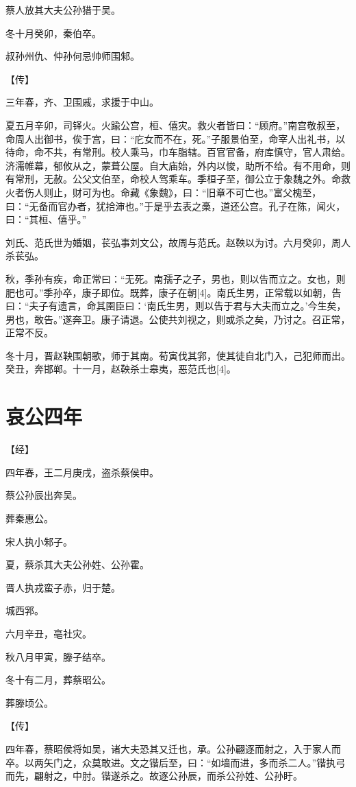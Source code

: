 \documentclass[a4paper,12pt,UTF8,twoside]{ctexbook}
\begin{document}
蔡人放其大夫公孙猎于吴。

冬十月癸卯，秦伯卒。

叔孙州仇、仲孙何忌帅师围邾。

【传】

三年春，齐、卫围戚，求援于中山。

夏五月辛卯，司铎火。火踰公宫，桓、僖灾。救火者皆曰：“顾府。”南宫敬叔至，命周人出御书，俟于宫，曰：“庀女而不在，死。”子服景伯至，命宰人出礼书，以待命，命不共，有常刑。校人乘马，巾车脂辖。百官官备，府库慎守，官人肃给。济濡帷幕，郁攸从之，蒙葺公屋。自大庙始，外内以悛，助所不给。有不用命，则有常刑，无赦。公父文伯至，命校人驾乘车。季桓子至，御公立于象魏之外。命救火者伤人则止，财可为也。命藏《象魏》，曰：“旧章不可亡也。”富父槐至，曰：“无备而官办者，犹拾渖也。”于是乎去表之槀，道还公宫。孔子在陈，闻火，曰：“其桓、僖乎。”

刘氏、范氏世为婚姻，苌弘事刘文公，故周与范氏。赵鞅以为讨。六月癸卯，周人杀苌弘。

秋，季孙有疾，命正常曰：“无死。南孺子之子，男也，则以告而立之。女也，则肥也可。”季孙卒，康子即位。既葬，康子在朝[4]。南氏生男，正常载以如朝，告曰：“夫子有遗言，命其圉臣曰：‘南氏生男，则以告于君与大夫而立之。’今生矣，男也，敢告。”遂奔卫。康子请退。公使共刘视之，则或杀之矣，乃讨之。召正常，正常不反。

冬十月，晋赵鞅围朝歌，师于其南。荀寅伐其郛，使其徒自北门入，己犯师而出。癸丑，奔邯郸。十一月，赵鞅杀士皋夷，恶范氏也[4]。


\chapter{哀公四年}



【经】

四年春，王二月庚戌，盗杀蔡侯申。

蔡公孙辰出奔吴。

葬秦惠公。

宋人执小邾子。

夏，蔡杀其大夫公孙姓、公孙霍。

晋人执戎蛮子赤，归于楚。

城西郛。

六月辛丑，亳社灾。

秋八月甲寅，滕子结卒。

冬十有二月，葬蔡昭公。

葬滕顷公。

【传】

四年春，蔡昭侯将如吴，诸大夫恐其又迁也，承。公孙翩逐而射之，入于家人而卒。以两矢门之，众莫敢进。文之锴后至，曰：“如墙而进，多而杀二人。”锴执弓而先，翩射之，中肘。锴遂杀之。故逐公孙辰，而杀公孙姓、公孙盱。
\end{document}
